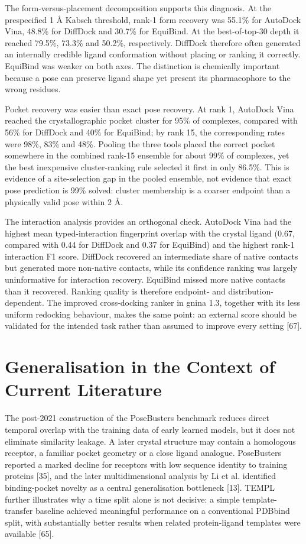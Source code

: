 The form-versus-placement decomposition supports this diagnosis. At the prespecified 1 Å Kabsch threshold, rank-1 form recovery was 55.1\% for AutoDock Vina, 48.8\% for DiffDock and 30.7\% for EquiBind. At the best-of-top-30 depth it reached 79.5\%, 73.3\% and 50.2\%, respectively. DiffDock therefore often generated an internally credible ligand conformation without placing or ranking it correctly. EquiBind was weaker on both axes. The distinction is chemically important because a pose can preserve ligand shape yet present its pharmacophore to the wrong residues.

Pocket recovery was easier than exact pose recovery. At rank 1, AutoDock Vina reached the crystallographic pocket cluster for 95\% of complexes, compared with 56\% for DiffDock and 40\% for EquiBind; by rank 15, the corresponding rates were 98\%, 83\% and 48\%. Pooling the three tools placed the correct pocket somewhere in the combined rank-15 ensemble for about 99\% of complexes, yet the best inexpensive cluster-ranking rule selected it first in only 86.5\%. This is evidence of a site-selection gap in the pooled ensemble, not evidence that exact pose prediction is 99\% solved: cluster membership is a coarser endpoint than a physically valid pose within 2 Å.

The interaction analysis provides an orthogonal check. AutoDock Vina had the highest mean typed-interaction fingerprint overlap with the crystal ligand (0.67, compared with 0.44 for DiffDock and 0.37 for EquiBind) and the highest rank-1 interaction F1 score. DiffDock recovered an intermediate share of native contacts but generated more non-native contacts, while its confidence ranking was largely uninformative for interaction recovery. EquiBind missed more native contacts than it recovered. Ranking quality is therefore endpoint- and distribution-dependent. The improved cross-docking ranker in gnina 1.3, together with its less uniform redocking behaviour, makes the same point: an external score should be validated for the intended task rather than assumed to improve every setting {[}67{]}.

\hypertarget{generalisation-in-the-context-of-current-literature}{%
\section{Generalisation in the Context of Current Literature}\label{generalisation-in-the-context-of-current-literature}}

The post-2021 construction of the PoseBusters benchmark reduces direct temporal overlap with the training data of early learned models, but it does not eliminate similarity leakage. A later crystal structure may contain a homologous receptor, a familiar pocket geometry or a close ligand analogue. PoseBusters reported a marked decline for receptors with low sequence identity to training proteins {[}35{]}, and the later multidimensional analysis by Li et al. identified binding-pocket novelty as a central generalisation bottleneck {[}13{]}. TEMPL further illustrates why a time split alone is not decisive: a simple template-transfer baseline achieved meaningful performance on a conventional PDBbind split, with substantially better results when related protein-ligand templates were available {[}65{]}.

